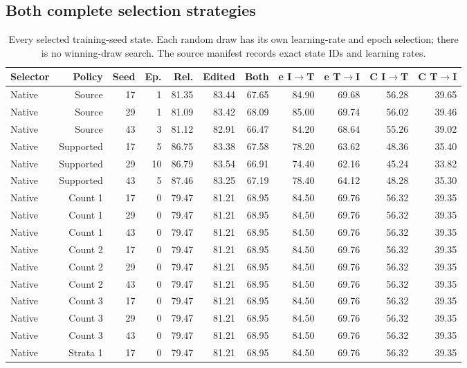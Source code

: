 \subsection{Both complete selection strategies}
\begin{table}[t]
\nolinenumbers
\centering
\small
\setlength{\tabcolsep}{3pt}
\begin{tabular}{lrrrrrrrrrr}
\toprule
Selector & Policy & Seed & Ep. & Rel. & Edited & Both & e I$\to$T & e T$\to$I & C I$\to$T & C T$\to$I\\
\midrule
Native & Source & 17 & 1 & 81.35 & 83.44 & 67.65 & 84.90 & 69.68 & 56.28 & 39.65\\
Native & Source & 29 & 1 & 81.09 & 83.42 & 68.09 & 85.00 & 69.74 & 56.02 & 39.46\\
Native & Source & 43 & 3 & 81.12 & 82.91 & 66.47 & 84.20 & 68.64 & 55.26 & 39.02\\
Native & Supported & 17 & 5 & 86.75 & 83.38 & 67.58 & 78.20 & 63.62 & 48.36 & 35.40\\
Native & Supported & 29 & 10 & 86.79 & 83.54 & 66.91 & 74.40 & 62.16 & 45.24 & 33.82\\
Native & Supported & 43 & 5 & 87.46 & 83.25 & 67.19 & 78.40 & 64.12 & 48.28 & 35.30\\
Native & Count 1 & 17 & 0 & 79.47 & 81.21 & 68.95 & 84.50 & 69.76 & 56.32 & 39.35\\
Native & Count 1 & 29 & 0 & 79.47 & 81.21 & 68.95 & 84.50 & 69.76 & 56.32 & 39.35\\
Native & Count 1 & 43 & 0 & 79.47 & 81.21 & 68.95 & 84.50 & 69.76 & 56.32 & 39.35\\
Native & Count 2 & 17 & 0 & 79.47 & 81.21 & 68.95 & 84.50 & 69.76 & 56.32 & 39.35\\
Native & Count 2 & 29 & 0 & 79.47 & 81.21 & 68.95 & 84.50 & 69.76 & 56.32 & 39.35\\
Native & Count 2 & 43 & 0 & 79.47 & 81.21 & 68.95 & 84.50 & 69.76 & 56.32 & 39.35\\
Native & Count 3 & 17 & 0 & 79.47 & 81.21 & 68.95 & 84.50 & 69.76 & 56.32 & 39.35\\
Native & Count 3 & 29 & 0 & 79.47 & 81.21 & 68.95 & 84.50 & 69.76 & 56.32 & 39.35\\
Native & Count 3 & 43 & 0 & 79.47 & 81.21 & 68.95 & 84.50 & 69.76 & 56.32 & 39.35\\
Native & Strata 1 & 17 & 0 & 79.47 & 81.21 & 68.95 & 84.50 & 69.76 & 56.32 & 39.35\\
\bottomrule
\end{tabular}
\caption{Every selected training-seed state. Each random draw has its own learning-rate and epoch selection; there is no winning-draw search. The source manifest records exact state IDs and learning rates.}\label{tab:fusel0}
\end{table}
